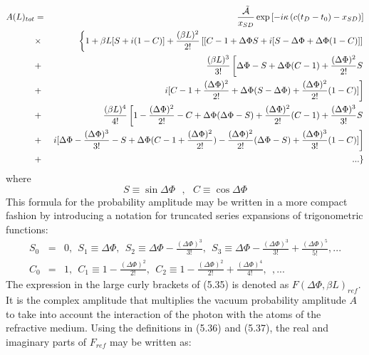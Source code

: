{ \begin{eqnarray}
      A(L)_{tot} & = &  \frac{\tilde{{\cal A}}}{x_{SD}}
   \exp\left[ - i \kappa\left(c(t_D-t_0)-x_{SD}\right)\right] \nonumber \\
        & \times & \left\{1 + \beta L[S+i(1-C)] +  \frac{(\beta L)^2}{2!}\left[[
         C-1+\Delta \Phi S  + i[S-\Delta \Phi +\Delta \Phi (1-C)]\right] \right. \nonumber \\
        & + & \frac{(\beta L)^3}{3!}\left[\Delta \Phi - S +\Delta \Phi (C-1) +\frac{(\Delta \Phi)^2}{2!}S
          \right. \nonumber \\
       & + & \left. i[C-1+\frac{(\Delta \Phi)^2}{2!}+ \Delta \Phi(S-\Delta \Phi)
            +\frac{(\Delta \Phi)^2}{2!}(1-C)]\right]  \nonumber \\
        & + &  \frac{(\beta L)^4}{4!} \left[
            1-\frac{(\Delta \Phi)^2}{2!}-C+ \Delta \Phi(\Delta \Phi-S)+
            \frac{(\Delta \Phi)^2}{2!}(C-1)+\frac{(\Delta \Phi)^3}{3!}S \right.  \nonumber \\
         &+& \left. i[ \Delta \Phi - \frac{(\Delta \Phi)^3}{3!} -S +
         \Delta \Phi (C-1 +\frac{(\Delta \Phi)^2}{2!} )- \frac{(\Delta \Phi)^2}{2!}(\Delta \Phi-S)
          + \frac{(\Delta \Phi)^3}{3!}(1-C)]\right] \nonumber \\
        & + & \left. ...\right\}
   \end{eqnarray}
    where
  \[ S\equiv \sin \Delta \Phi~~~,~~~ C\equiv \cos \Delta \Phi \]
    This formula for the probability amplitude may be written in a more compact fashion by introducing
    a notation for truncated series expansions of trigonometric functions: 
 \begin{eqnarray}
     S_0 & = & 0,~~ S_1 \equiv  \Delta \Phi,~~ S_2 \equiv \Delta \Phi-  \frac{(\Delta \Phi)^3}{3!},~~
      S_3 \equiv \Delta \Phi-  \frac{(\Delta \Phi)^3}{3!}+ \frac{(\Delta \Phi)^5}{5!} ,...\\
   C_0 & = & 1,~~ C_1 \equiv  1- \frac{(\Delta \Phi)^2}{2!},~~ C_2 \equiv 1- \frac{(\Delta \Phi)^2}{2!}
       + \frac{(\Delta \Phi)^4}{4!},~~ , ...
   \end{eqnarray}
    The expression in the large curly brackets of (5.35) is denoted as $F(\Delta \Phi,\beta L)_{ref}$.
    It is the complex amplitude that multiplies the vacuum probability amplitude $A$
    to take into account the interaction of
    the photon with the atoms of the refractive medium. Using the definitions in (5.36) and (5.37), 
    the real and imaginary parts of  $F_{ref}$ may be written as:
   \begin{eqnarray}

\end{eqnarray}}
